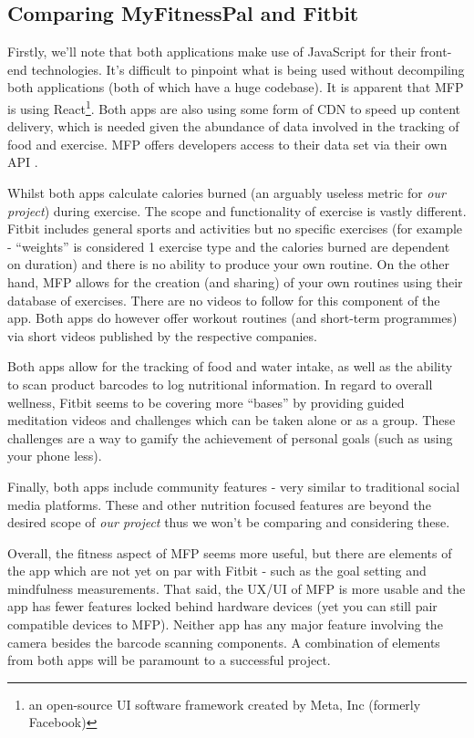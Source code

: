 \subsection{Comparing MyFitnessPal and Fitbit}
Firstly, we'll note that both applications make use of JavaScript for their front-end technologies.
It's difficult to pinpoint what is being used without decompiling both applications (both of which have a huge codebase).
It is apparent that MFP is using React\footnote{an open-source UI software framework created by Meta, Inc (formerly Facebook)}.
Both apps are also using some form of CDN to speed up content delivery, which is needed given the abundance of data involved in
the tracking of food and exercise. MFP offers developers access to their data set via their own API \cite{mfp-api}.
\par
Whilst both apps calculate calories burned (an arguably useless metric for \textit{our project})
during exercise. The scope and functionality of exercise is vastly different.
Fitbit includes general sports and activities but no specific exercises (for example
- ``weights'' is considered 1 exercise type and the calories burned are dependent on duration)
and there is no ability
to produce your own routine.
On the other hand, MFP allows for the creation (and sharing) of your own routines using their
database of exercises. There are no videos to follow for this component of the app.
Both apps do however offer workout routines (and short-term programmes) via 
short videos published by the respective companies.
\par
Both apps allow for the tracking of food and water intake, as well as the ability
to scan product barcodes to log nutritional information. In regard to overall wellness,
Fitbit seems to be covering more ``bases'' by providing guided meditation videos and challenges
which can be taken alone or as a group. These challenges are a way to gamify the achievement of
personal goals (such as using your phone less).
\par
Finally, both apps include community features - very similar to traditional social media platforms.
These and other nutrition focused features are beyond the desired scope of \textit{our project}  thus we won't be
comparing and considering these.
\par
Overall, the fitness aspect of MFP seems more useful, but there are elements of the app which are not yet
on par with Fitbit - such as the goal setting and mindfulness measurements. 
That said, the UX/UI of MFP is more usable and the app has fewer features locked behind hardware devices
(yet you can still pair compatible devices to MFP). Neither app has any major feature involving the camera besides
the barcode scanning components. A combination of elements from both apps will be paramount to a successful project.
\par

